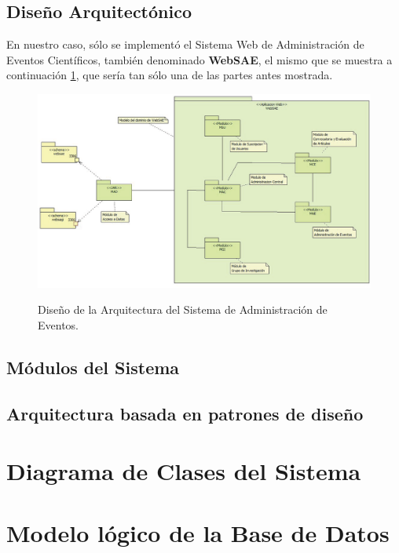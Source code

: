 \subsection{Dise\~no Arquitect\'onico}
\begin{indentar}
En nuestro caso, s\'olo se implement\'o el Sistema Web de Administraci\'on de Eventos Cient\'ificos, tambi\'en denominado \textbf{WebSAE}, el mismo que se muestra a continuaci\'on \ref{websae:arquitectura}, que ser\'ia tan s\'olo una de las partes antes mostrada.

\begin{landscape}
\begin{figure}
  \centering
    {\includegraphics[width=1.4\textwidth]{images/websae-arquitectura.eps}}
  \caption{Dise\~no de la Arquitectura del Sistema de Administraci\'on de Eventos.}
  \label{websae:arquitectura}
\end{figure}
\end{landscape}

\end{indentar}

\subsection{M\'odulos del Sistema}
\begin{indentar}
\end{indentar}

\subsection{Arquitectura basada en patrones de dise\~no}
\begin{indentar}
\end{indentar}

\section{Diagrama de Clases del Sistema}
\begin{indentar}
\end{indentar}

\section{Modelo l\'ogico de la Base de Datos}
\begin{indentar}
\end{indentar}
